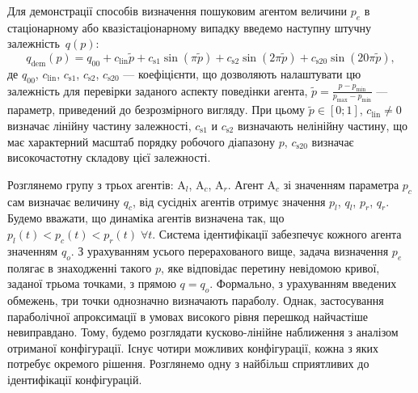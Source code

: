 \documentclass[a4paper,13pt]{atuaref}
\begin{document}
Для демонстрації способів визначення пошуковим агентом величини $ p_e $ в
стаціонарному або квазістаціонарному випадку введемо наступну штучну залежність~$q(p)$:
%
\begin{equation}
  q_\mathrm{dem}(p) = q_{00} + c_\mathrm{lin} \tilde{p} + c_\mathrm{s1} \sin( \pi \tilde{p} ) + c_\mathrm{s2} \sin( 2 \pi \tilde{p} ) + c_\mathrm{s20} \sin( 20 \pi \tilde{p} ),
  \label{atu:eq:q_dem}
\end{equation}
%
де $q_{00}$, $c_\mathrm{lin}$, $c_\mathrm{s1}$, $c_\mathrm{s2}$, $c_\mathrm{s20}$
---
коефіцієнти, що дозволяють налаштувати цю залежність для перевірки заданого аспекту поведінки агента,
$ \tilde{p} = \frac{p - p_{\min}}{p_{\max} - p_{\min}} $
---
параметр, приведений до безрозмірного вигляду.
При цьому $\tilde{p} \in[0;1]$, $c_\mathrm{lin} \ne 0$
визначає лінійну частину залежності,
$c_\mathrm{s1}$ и $c_\mathrm{s2}$
визначають нелінійну частину, що має характерний масштаб порядку робочого діапазону $p$,
$c_\mathrm{s20}$ визначає високочастотну складову цієї залежності.

%
%


Розглянемо групу з трьох агентів:
$\mathrm{A}_l$,
$\mathrm{A}_c$,
$\mathrm{A}_r$.
%
Агент $ \mathrm {A} _c $ зі значенням параметра $ p_c $ сам визначає величину
$ q_c $, від сусідніх агентів отримує значення $p_l$, $q_l$, $p_r$, $q_r$.
Будемо вважати, що динаміка агентів визначена так, що
$ p_l(t) < p_c (t) < p_r(t) \; \forall t $.
Система ідентифікації забезпечує кожного агента
значенням $ q_o $. З урахуванням усього перерахованого вище, задача
визначення $ p_e $ полягає в знаходженні такого $ p $, яке відповідає перетину
невідомою кривої, заданої трьома точками, з прямою $ q = q_o $.
Формально, з урахуванням введених обмежень, три точки однозначно визначають параболу. Однак,
застосування параболічної апроксимації в умовах високого рівня перешкод
найчастіше невиправдано.
Тому, будемо розглядати кусково-лінійне наближення з
аналізом отриманої конфігурації. Існує чотири можливих конфігурації,
кожна з яких потребує окремого рішення. Розглянемо одну з найбільш
сприятливих до ідентифікації конфігурацій.
\end{document}

